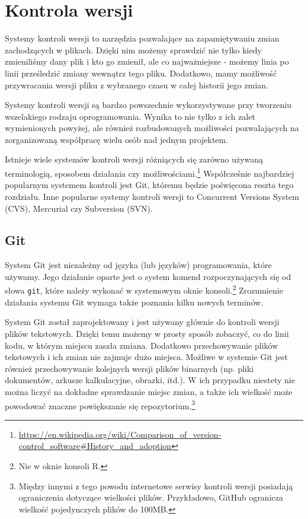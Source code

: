 \documentclass[paper=6in:9in,pagesize=pdftex,headinclude=on,footinclude=on,10pt]{scrbook}
\begin{document}
\hypertarget{kontrola-wersji}{%
\chapter{Kontrola wersji}\label{kontrola-wersji}}

Systemy kontroli wersji to narzędzia pozwalające na zapamiętywaniu zmian zachodzących w plikach.
Dzięki nim możemy sprawdzić nie tylko kiedy zmieniliśmy dany plik i kto go zmienił, ale co najważniejsze - możemy linia po linii prześledzić zmiany wewnątrz tego pliku.
Dodatkowo, mamy możliwość przywracania wersji pliku z wybranego czasu w całej historii jego zmian.

Systemy kontroli wersji są bardzo powszechnie wykorzystywane przy tworzeniu wszelakiego rodzaju oprogramowania.
Wynika to nie tylko z ich zalet wymienionych powyżej, ale również rozbudowanych możliwości pozwalających na zorganizowaną współpracę wielu osób nad jednym projektem.

Istnieje wiele systemów kontroli wersji różniących się zarówno używaną terminologią, sposobem działania czy możliwościami.\footnote{\url{https://en.wikipedia.org/wiki/Comparison_of_version-control_software\#History_and_adoption}}
Współcześnie najbardziej popularnym systemem kontroli jest Git, któremu będzie poświęcona reszta tego rozdziału.
Inne popularne systemy kontroli wersji to Concurrent Versions System (CVS), Mercurial czy Subversion (SVN).

\hypertarget{git}{%
\section{Git}\label{git}}

System Git jest niezależny od języka (lub języków) programowania, które używamy.
Jego działanie oparte jest o system komend rozpoczynających się od słowa \texttt{git}, które należy wykonać w systemowym oknie konsoli.\footnote{Nie w oknie konsoli R.}
Zrozumienie działania systemu Git wymaga także poznania kilku nowych terminów.

System Git został zaprojektowany i jest używany głównie do kontroli wersji plików tekstowych.
Dzięki temu możemy w prosty sposób zobaczyć, co do linii kodu, w którym miejscu zaszła zmiana.
Dodatkowo przechowywanie plików tekstowych i ich zmian nie zajmuje dużo miejsca.
Możliwe w systemie Git jest również przechowywanie kolejnych wersji plików binarnych (np. pliki dokumentów, arkusze kalkulacyjne, obrazki, itd.).
W ich przypadku niestety nie można liczyć na dokładne sprawdzanie miejsc zmian, a także ich wielkość może powodować znaczne powiększanie się repozytorium.\footnote{Między innymi z tego powodu internetowe serwisy kontroli wersji posiadają ograniczenia dotyczące wielkości plików.
  Przykładowo, GitHub ogranicza wielkość pojedynczych plików do 100MB.}
\end{document}
